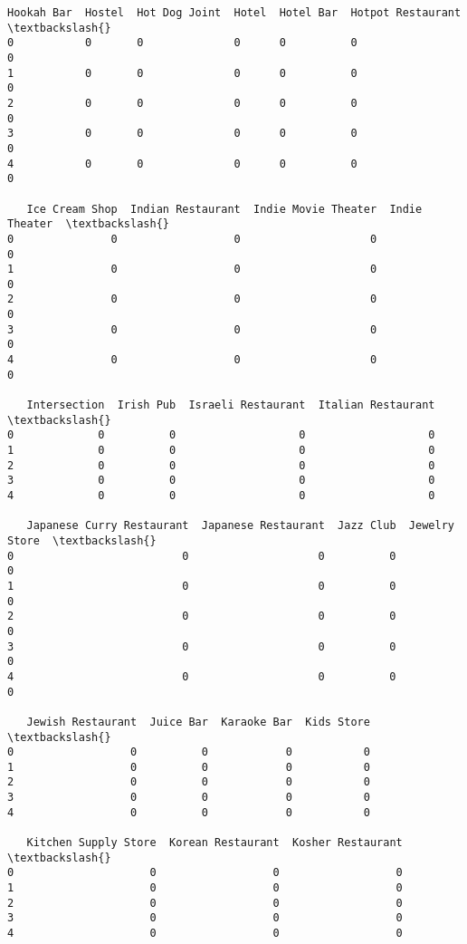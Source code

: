 \documentclass[11pt]{article}
\begin{document}
\begin{tcolorbox}[breakable, size=fbox, boxrule=.5pt, pad at break*=1mm, opacityfill=0]
\begin{Verbatim}[commandchars=\\\{\}]
   Hookah Bar  Hostel  Hot Dog Joint  Hotel  Hotel Bar  Hotpot Restaurant  \textbackslash{}
0           0       0              0      0          0                  0
1           0       0              0      0          0                  0
2           0       0              0      0          0                  0
3           0       0              0      0          0                  0
4           0       0              0      0          0                  0

   Ice Cream Shop  Indian Restaurant  Indie Movie Theater  Indie Theater  \textbackslash{}
0               0                  0                    0              0
1               0                  0                    0              0
2               0                  0                    0              0
3               0                  0                    0              0
4               0                  0                    0              0

   Intersection  Irish Pub  Israeli Restaurant  Italian Restaurant  \textbackslash{}
0             0          0                   0                   0
1             0          0                   0                   0
2             0          0                   0                   0
3             0          0                   0                   0
4             0          0                   0                   0

   Japanese Curry Restaurant  Japanese Restaurant  Jazz Club  Jewelry Store  \textbackslash{}
0                          0                    0          0              0
1                          0                    0          0              0
2                          0                    0          0              0
3                          0                    0          0              0
4                          0                    0          0              0

   Jewish Restaurant  Juice Bar  Karaoke Bar  Kids Store  \textbackslash{}
0                  0          0            0           0
1                  0          0            0           0
2                  0          0            0           0
3                  0          0            0           0
4                  0          0            0           0

   Kitchen Supply Store  Korean Restaurant  Kosher Restaurant  \textbackslash{}
0                     0                  0                  0
1                     0                  0                  0
2                     0                  0                  0
3                     0                  0                  0
4                     0                  0                  0


\end{Verbatim}
\end{tcolorbox}
\end{document}
